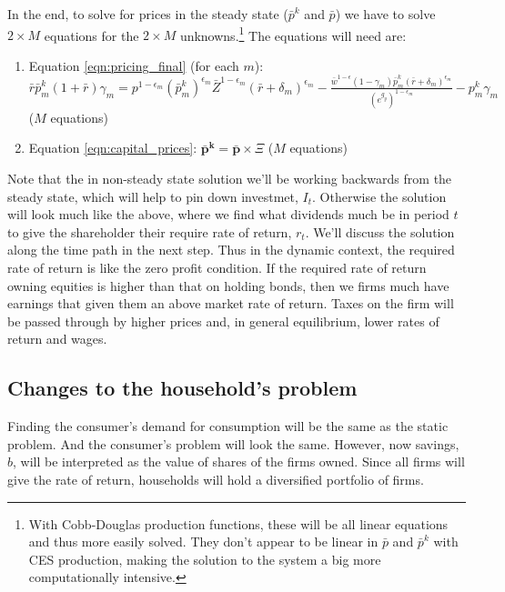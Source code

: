 \documentclass[letterpaper,12pt]{article}
\theoremstyle{definition}
\begin{document}
In the end, to solve for prices in the steady state ($\bar{p}^{k}$ and $\bar{p}$) we have to solve $2\times M$ equations for the $2\times M$ unknowns.\footnote{With Cobb-Douglas production functions, these will be all linear equations and thus more easily solved.  They don't appear to be linear in $\bar{p}$ and $\bar{p}^{k}$ with CES production, making the solution to the system a big more computationally intensive.}  The equations will need are:

\begin{enumerate}
\item Equation \ref{eqn:pricing_final} (for each $m$):  $ \bar{r}\bar{p}^{k}_{m}(1+\bar{r})\gamma_{m}  = p^{1-\epsilon_{m}}\left(\bar{p}^{k}_{m}\right)^{\epsilon_{m}}\bar{Z}^{1-\epsilon_{m}}(\bar{r}+\delta_{m})^{\epsilon_{m}} - \frac{\bar{w}^{1-\epsilon}(1-\gamma_{m})\bar{p}^{k}_{m}(\bar{r}+\delta_{m})^{\epsilon_{m}}}{\left(e^{g_{y}}\right)^{1-\epsilon_{m}}} - p^{k}_{m}\gamma_{m}$ ($M$ equations)
\item Equation \ref{eqn:capital_prices}: $\boldsymbol{\bar{p}^{k}} =\boldsymbol{\bar{p}} \times \Xi$ ($M$ equations)
\end{enumerate} 

Note that the in non-steady state solution we'll be working backwards from the steady state, which will help to pin down investmet, $I_{t}$.  Otherwise the solution will look much like the above, where we find what dividends much be in period $t$ to give the shareholder their require rate of return, $r_{t}$.  We'll discuss the solution along the time path in the next step.  Thus in the dynamic context, the required rate of return is like the zero profit condition.  If the required rate of return owning equities is higher than that on holding bonds, then we firms much have earnings that given them an above market rate of return.  Taxes on the firm will be passed through by higher prices and, in general equilibrium, lower rates of return and wages.

\subsection*{Changes to the household's problem}

Finding the consumer's demand for consumption will be the same as the static problem.  And the consumer's problem will look the same.  However, now savings, $b$, will be interpreted as the value of shares of the firms owned.  Since all firms will give the rate of return, households will hold a diversified portfolio of firms.  
\end{document}
